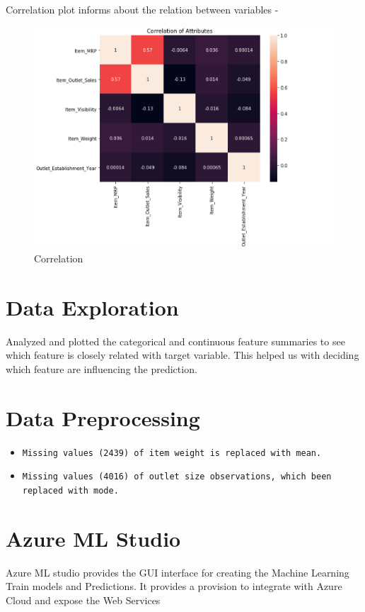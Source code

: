 Correlation plot informs about the relation between variables -
\begin{figure}[pic2]
	\centering\includegraphics[width=\columnwidth]{Images/mlstudio/Correlation.png}
	\caption{Correlation}\label{fig:Correlation}
\end{figure}

\section{Data Exploration}
Analyzed and plotted the categorical and continuous feature summaries to see which feature is 
closely related with target variable. This helped us with deciding which feature are influencing 
the prediction.

\section{Data Preprocessing}
\begin{itemize}
\item \verb|Missing values (2439) of item weight is replaced with mean.|
\item \verb|Missing values (4016) of outlet size observations, which been replaced with mode.|
\end{itemize}


\section{Azure ML Studio}
Azure ML studio provides the GUI interface for creating the Machine Learning Train 
models and Predictions. It provides a provision to integrate with Azure Cloud and 
expose the Web Services

